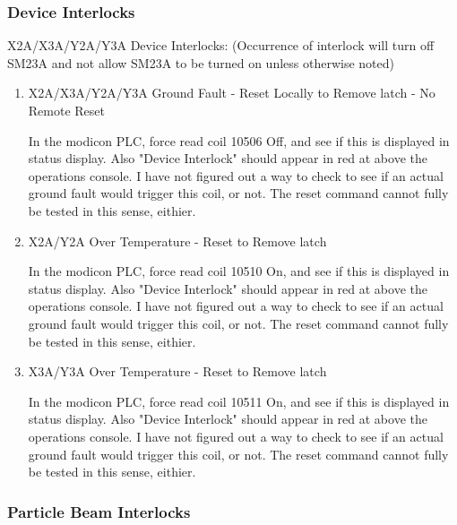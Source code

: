 \documentclass[11pt]{book}		%
\begin{document}
\subsubsection{Device Interlocks}\label{sect:cyc-equip-ctl-beamline-sm23a-state-monitors-device-interlocks}

X2A/X3A/Y2A/Y3A Device Interlocks:
(Occurrence of interlock will turn off SM23A and not allow SM23A to be turned on unless otherwise noted)

\begin{enumerate}
 \item X2A/X3A/Y2A/Y3A Ground Fault - Reset Locally to Remove latch - No Remote Reset

\color{red}
In the modicon PLC, force read coil 10506 Off, and see if this is displayed in status display. Also "Device Interlock" should appear in red at above the operations console. I have not figured out a way to check to see if an actual ground fault would trigger this coil, or not. The reset command cannot fully be tested in this sense, eithier.
\color{black}

 \item X2A/Y2A Over Temperature - Reset to Remove latch

\color{red}
In the modicon PLC, force read coil 10510 On, and see if this is displayed in status display. Also "Device Interlock" should appear in red at above the operations console. I have not figured out a way to check to see if an actual ground fault would trigger this coil, or not. The reset command cannot fully be tested in this sense, eithier.
\color{black}

 \item X3A/Y3A Over Temperature - Reset to Remove latch

\color{red}
In the modicon PLC, force read coil 10511 On, and see if this is displayed in status display. Also "Device Interlock" should appear in red at above the operations console. I have not figured out a way to check to see if an actual ground fault would trigger this coil, or not. The reset command cannot fully be tested in this sense, eithier.
\color{black}

\end{enumerate}

\subsubsection{Particle Beam Interlocks}\label{sect:cyc-equip-ctl-beamline-sm23a-state-monitors-beam-interlocks}
\end{document}
